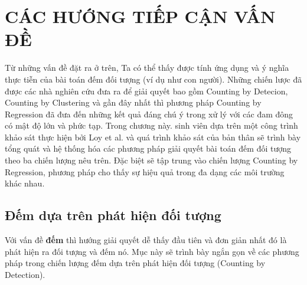 \chapter{CÁC HƯỚNG TIẾP CẬN VẤN ĐỀ}
\ifpdf
    \graphicspath{{Chapter2/Chapter2Figs/PNG/}{Chapter2/Chapter2Figs/PDF/}{Chapter2/Chapter2Figs/}}
\else
    \graphicspath{{Chapter2/Chapter2Figs/EPS/}{Chapter2/Chapter2Figs/}}
\fi


Từ những vấn đề đặt ra ở trên, Ta có thể thấy được tính ứng dụng và ý nghĩa thực tiễn của bài toán đếm đối tượng (ví dụ như con người). Những chiến lược đã được các nhà nghiên cứu đưa ra để giải quyết bao gồm Counting by Detecion, Counting by Clustering và gần đây nhất thì phương pháp Counting by Regression đã đưa đến những kết quả đáng chú ý trong xử lý với các đam đông có mật độ lớn và phức tạp. Trong chương này. sinh viên dựa trên một công trình khảo sát thực hiện bởi Loy et al. \cite{loy2013crowd} và quá trình khảo sát của bản thân sẽ trình bày tổng quát và hệ thống hóa các phương pháp giải quyết bài toán đếm đối tượng theo ba chiến lượng nêu trên. Đặc biệt sẽ tập trung vào chiến lượng Counting by Regression, phương pháp cho thấy sự hiệu quả trong đa dạng các môi trường khác nhau.
\section{Đếm dựa trên phát hiện đối tượng}
Với vấn đề \textbf{đếm} thì hướng giải quyết dễ thấy đầu tiên và đơn giản nhất đó là phát hiện ra đối tượng và đếm nó. Mục này sẽ trình bày ngắn gọn về các phương pháp trong chiến lượng đếm dựa trên phát hiện đối tượng (Counting by Detection). \par

